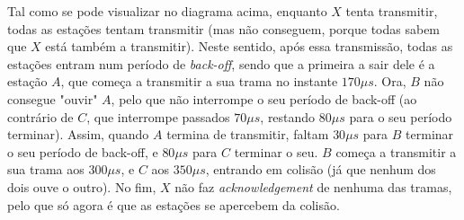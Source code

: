 \begin{figure}[H]
  \centering
  
\end{figure}

Tal como se pode visualizar no diagrama acima, enquanto $X$ tenta transmitir,
todas as estações tentam transmitir (mas não conseguem, porque todas sabem
que $X$ está também a transmitir). Neste sentido, após essa transmissão,
todas as estações entram num período de \textit{back-off}, sendo que a primeira
a sair dele é a estação $A$, que começa a transmitir a sua trama no instante
$170 \mu s$. Ora, $B$ não consegue "ouvir" $A$, pelo que não interrompe o
seu período de back-off (ao contrário de $C$, que interrompe passados $70 \mu s$,
restando $80 \mu s$ para o seu período terminar). Assim, quando $A$ termina
de transmitir, faltam $30 \mu s$ para $B$ terminar o seu período de back-off,
e $80 \mu s$ para $C$ terminar o seu. $B$ começa a transmitir a sua trama
aos $300 \mu s$, e $C$ aos $350 \mu s$, entrando em colisão (já que nenhum dos
dois ouve o outro). No fim, $X$ não faz \textit{acknowledgement} de nenhuma
das tramas, pelo que só agora é que as estações se apercebem da colisão.

